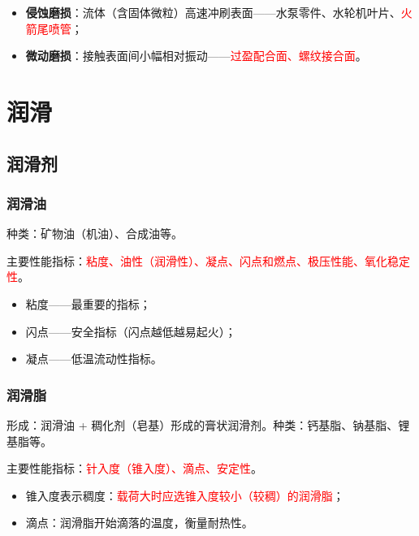 \begin{definition}[其它磨损类型]
\label{def:其它磨损类型}
\begin{itemize}
	\item \textbf{侵蚀磨损}：流体（含固体微粒）高速冲刷表面——水泵零件、水轮机叶片、\textcolor{red}{火箭尾喷管}；
	\item \textbf{微动磨损}：接触表面间小幅相对振动——\textcolor{red}{过盈配合面、螺纹接合面}。
\end{itemize}
\end{definition}

\section{润滑}
\label{sec:润滑}

\subsection{润滑剂}

\subsubsection{润滑油}
\begin{definition}[润滑油及其主要性能指标]
\label{def:润滑油}
种类：矿物油（机油）、合成油等。

主要性能指标：\textcolor{red}{粘度、油性（润滑性）、凝点、闪点和燃点、极压性能、氧化稳定性}。
\begin{itemize}
	\item 粘度——最重要的指标；
	\item 闪点——安全指标（闪点越低越易起火）；
	\item 凝点——低温流动性指标。
\end{itemize}
\end{definition}

\subsubsection{润滑脂}
\begin{definition}[润滑脂及其主要性能指标]
\label{def:润滑脂}
形成：润滑油 + 稠化剂（皂基）形成的膏状润滑剂。种类：钙基脂、钠基脂、锂基脂等。

主要性能指标：\textcolor{red}{针入度（锥入度）、滴点、安定性}。
\begin{itemize}
	\item 锥入度表示稠度：\textcolor{red}{载荷大时应选锥入度较小（较稠）的润滑脂}；
	\item 滴点：润滑脂开始滴落的温度，衡量耐热性。
\end{itemize}
\end{definition}


